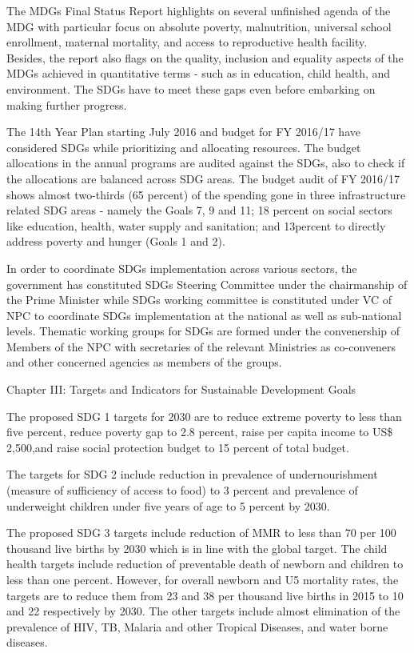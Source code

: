 \documentclass[
  openany]{book}
\begin{document}
The MDGs Final Status Report highlights on several unfinished agenda of the MDG with particular focus on absolute poverty, malnutrition, universal school enrollment, maternal mortality, and access to reproductive health facility. Besides, the report also flags on the quality, inclusion and equality aspects of the MDGs achieved in quantitative terms - such as in education, child health, and environment. The SDGs have to meet these gaps even before embarking on making further progress.

The 14th Year Plan starting July 2016 and budget for FY 2016/17 have considered SDGs while prioritizing and allocating resources. The budget allocations in the annual programs are audited against the SDGs, also to check if the allocations are balanced across SDG areas. The budget audit of FY 2016/17 shows almost two-thirds (65 percent) of the spending gone in three infrastructure related SDG areas - namely the Goals 7, 9 and 11; 18 percent on social sectors like education, health, water supply and sanitation; and 13percent to directly address poverty and hunger (Goals 1 and 2).

In order to coordinate SDGs implementation across various sectors, the government has constituted SDGs Steering Committee under the chairmanship of the Prime Minister while SDGs working committee is constituted under VC of NPC to coordinate SDGs implementation at the national as well as sub-national levels. Thematic working groups for SDGs are formed under the convenership of Members of the NPC with secretaries of the relevant Ministries as co-conveners and other concerned agencies as members of the groups.

Chapter III: Targets and Indicators for Sustainable Development Goals

The proposed SDG 1 targets for 2030 are to reduce extreme poverty to less than five percent, reduce poverty gap to 2.8 percent, raise per capita income to US\$ 2,500,and raise social protection budget to 15 percent of total budget.

The targets for SDG 2 include reduction in prevalence of undernourishment (measure of sufficiency of access to food) to 3 percent and prevalence of underweight children under five years of age to 5 percent by 2030.

The proposed SDG 3 targets include reduction of MMR to less than 70 per 100 thousand live births by 2030 which is in line with the global target. The child health targets include reduction of preventable death of newborn and children to less than one percent. However, for overall newborn and U5 mortality rates, the targets are to reduce them from 23 and 38 per thousand live births in 2015 to 10 and 22 respectively by 2030. The other targets include almost elimination of the prevalence of HIV, TB, Malaria and other Tropical Diseases, and water borne diseases.
\end{document}
